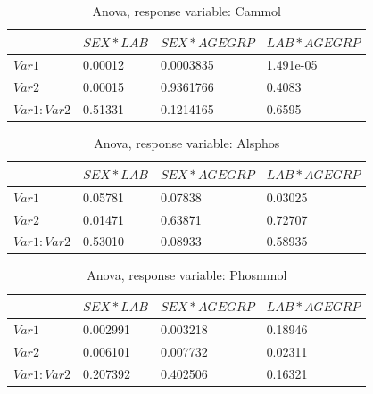 \documentclass{article}
\begin{document}
    \begin{table}
    \begin{center}
    \begin{tabular}{|l|l|l|l|}
      \hline
      &$SEX * LAB$&$SEX * AGEGRP$&$LAB*AGEGRP$\\
      \hline
      $Var1$       & 0.00012 & 0.0003835 & 1.491e-05\\
      $Var2$       & 0.00015 & 0.9361766 & 0.4083\\
      $Var1:Var2$  & 0.51331 & 0.1214165 & 0.6595\\
      \hline
    \end{tabular}
    \caption{Anova, response variable: Cammol}
    \label{table:AnCammol}
    \end{center}
    \end{table}

    \begin{table}
    \begin{center}
    \begin{tabular}{|l|l|l|l|}
      \hline
      &$SEX * LAB$&$SEX * AGEGRP$&$LAB*AGEGRP$\\
      \hline
      $Var1$       & 0.05781 & 0.07838 & 0.03025\\
      $Var2$       & 0.01471 & 0.63871 & 0.72707\\
      $Var1:Var2$  & 0.53010 & 0.08933 & 0.58935\\
      \hline
    \end{tabular}
    \caption{Anova, response variable: Alsphos}
    \label{table:AnAlsphos}
    \end{center}
    \end{table}

    \begin{table}
    \begin{center}
    \begin{tabular}{|l|l|l|l|}
      \hline
      &$SEX * LAB$&$SEX * AGEGRP$&$LAB*AGEGRP$\\
      \hline
      $Var1$       & 0.002991 & 0.003218 & 0.18946\\
      $Var2$       & 0.006101 & 0.007732 & 0.02311\\
      $Var1:Var2$  & 0.207392 & 0.402506 & 0.16321\\
      \hline
    \end{tabular}
    \caption{Anova, response variable: Phosmmol}
    \label{table:AnPhosmmol}
    \end{center}
    \end{table}
    
\end{document}
